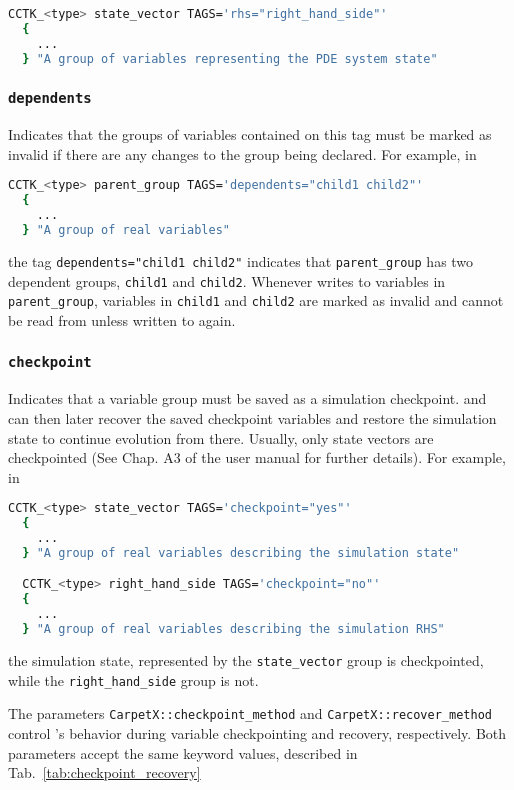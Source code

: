 \begin{lstlisting}[language=bash]
  CCTK_<type> state_vector TAGS='rhs="right_hand_side"'
  {
    ...
  } "A group of variables representing the PDE system state"
\end{lstlisting}

\subsubsection{\texttt{dependents}}

Indicates that the groups of variables contained on this tag must be marked as invalid if there are any changes to the group being declared. For example, in
%
\begin{lstlisting}[language=bash]
  CCTK_<type> parent_group TAGS='dependents="child1 child2"'
  {
    ...
  } "A group of real variables"
\end{lstlisting}
%
the tag \texttt{dependents="child1 child2"} indicates that \texttt{parent\_group} has two dependent groups, \texttt{child1} and \texttt{child2}. Whenever \CarpetX\space writes to variables in \texttt{parent\_group}, variables in \texttt{child1} and \texttt{child2} are marked as invalid and cannot be read from unless written to again.

\subsubsection{\texttt{checkpoint}}

Indicates that a variable group must be saved as a simulation checkpoint. \Cactus\space and \CarpetX\space can then later recover the saved checkpoint variables and restore the simulation state to continue evolution from there. Usually, only state vectors are checkpointed (See Chap. A3 of the \Cactus user manual for further details). For example, in
%
\begin{lstlisting}[language=bash]
  CCTK_<type> state_vector TAGS='checkpoint="yes"'
  {
    ...
  } "A group of real variables describing the simulation state"

  CCTK_<type> right_hand_side TAGS='checkpoint="no"'
  {
    ...
  } "A group of real variables describing the simulation RHS"
\end{lstlisting}
%
the simulation state, represented by the \texttt{state\_vector} group is checkpointed, while the \texttt{right\_hand\_side} group is not.

The parameters \texttt{CarpetX::checkpoint\_method} and \texttt{CarpetX::recover\_method} control \CarpetX's behavior during variable checkpointing and recovery, respectively. Both parameters accept the same keyword values, described in Tab.~\ref{tab:checkpoint_recovery}

